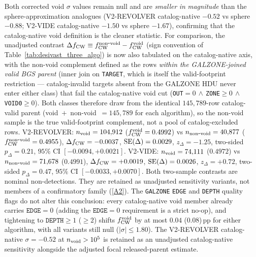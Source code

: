 \documentclass[aps,prd,twocolumn,superscriptaddress,showpacs,preprintnumbers,nofootinbib,longbibliography,floatfix]{revtex4-2}
\newcommand{\repoBase}{https://github.com/Hubify-Projects/bigbounce/blob/main}
\begin{document}
Both corrected void $\sigma$ values remain null and are
\emph{smaller in magnitude} than the sphere-approximation analogues
(V2-REVOLVER catalog-native $-0.52$ vs sphere $-0.88$; V2-VIDE
catalog-native $-1.50$ vs sphere $-1.67$), confirming that the
catalog-native void definition is the cleaner statistic.
For comparison, the unadjusted contrast $\Delta f_{\rm CW} \equiv
f_{\rm CW}^{\rm non\mbox{-}void} - f_{\rm CW}^{\rm void}$
(sign convention of Table~\ref{tab:desivast_three_algo}) is now also
tabulated on the catalog-native axis, with the non-void complement
defined as the rows \emph{within the GALZONE-joined valid BGS parent}
(inner join on \texttt{TARGET}, which is itself the valid-footprint
restriction --- catalog-invalid targets absent from the GALZONE HDU
never enter either class) that fail the catalog-native void cut
(\texttt{OUT}$=0\,\wedge\,$\texttt{ZONE}$\geq 0\,\wedge\,$%
\texttt{VOID0}$\geq 0$). Both classes therefore draw from the identical
$145{,}789$-row catalog-valid parent (void~$+$~non-void~$=145{,}789$ for
each algorithm), so the non-void sample is the true valid-footprint
complement, not a pool of catalog-excluded rows. V2-REVOLVER: $n_{\rm void} = 104{,}912$
($f_{\rm CW}^{\rm void} = 0.4992$) vs $n_{\rm non\mbox{-}void} =
40{,}877$ ($f_{\rm CW}^{\rm non\mbox{-}void} = 0.4955$),
$\Delta f_{\rm CW} = -0.0037$, ${\rm SE}(\Delta) = 0.0029$,
$z_\Delta = -1.25$, two-sided $p_\Delta = 0.21$, $95\%$ CI
$[-0.0094, +0.0021]$. V2-VIDE: $n_{\rm void} = 74{,}111$
($0.4972$) vs $n_{\rm non\mbox{-}void} = 71{,}678$ ($0.4991$),
$\Delta f_{\rm CW} = +0.0019$, ${\rm SE}(\Delta) = 0.0026$,
$z_\Delta = +0.72$, two-sided $p_\Delta = 0.47$, $95\%$ CI
$[-0.0033, +0.0070]$. Both two-sample contrasts are nominal
non-detections. They are retained as unadjusted sensitivity variants,
not members of a confirmatory family
(\href{\repoBase/pipelines/p5\_desi\_chirality/outputs/30\_ext4\_galzone\_complement\_contrasts.json}{[A2]}). The
\texttt{GALZONE} \texttt{EDGE} and \texttt{DEPTH} quality flags do not
alter this conclusion: every catalog-native void member already
carries $\texttt{EDGE} = 0$ (adding the $\texttt{EDGE} = 0$
requirement is a strict no-op), and tightening to
$\texttt{DEPTH} \geq 1$ ($\geq 2$) shifts $f_{\rm CW}^{\rm void}$ by
at most $0.04$ ($0.08$)\,pp for either algorithm, with all variants
still null ($|\sigma| \leq 1.80$). The V2-REVOLVER
catalog-native $\sigma = -0.52$ at $n_{\rm void} > 10^{5}$ is retained
as an unadjusted catalog-native sensitivity alongside the adjusted
focal released-parent estimate.
\end{document}
